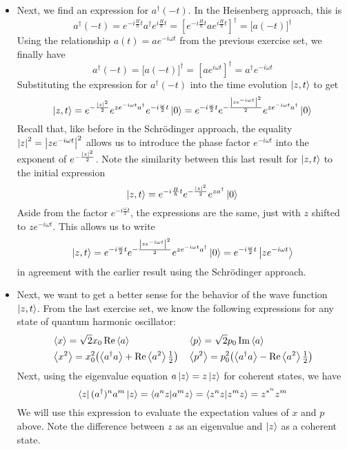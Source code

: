 \documentclass[11pt, a4paper]{article}
\newcommand{\Schro}{Schr\"{o}dinger\xspace}
\newcommand{\tev}{e^{-i\frac{H}{\hbar}t}}  %
\newcommand{\tevp}{e^{i\frac{H}{\hbar}t}}  %
\newcommand{\evb}[1]{\big \langle {#1} \big \rangle}  %
\begin{document}
\begin{itemize}
	\item Next, we find an expression for $ a^{\dagger}(-t) $. In the Heisenberg approach, this is
	\begin{equation*}
		a^{\dagger}(-t) = \tev a^{\dagger} \tevp = \left[\tev a \tevp\right]^{\dagger} = \big[a(-t)\big]^{\dagger}
	\end{equation*}
	Using the relationship $ a(t) = ae^{-i\omega t} $ from the previous exercise set, we finally have
	\begin{equation*}
		a^{\dagger}(-t) = \big[a(-t)\big]^{\dagger} = \left[ae^{i\omega t}\right]^{\dagger} = a^{\dagger}e^{-i\omega t}
	\end{equation*}
	Substituting the expression for $  a^{\dagger}(-t)  $ into the time evolution $ \ket{z, t} $ to get
	\begin{equation*}
		\ket{z, t} = e^{-\frac{\abs{z}^{2}}{2}}  e^{ze^{-i\omega t}a^{\dagger}} e^{-i\frac{\omega}{2}t}\ket{0} =  e^{-i\frac{\omega}{2}t} e^{-\frac{\abs{ze^{-i\omega t}}^{2}}{2}} e^{ze^{-i\omega t}a^{\dagger}}\ket{0}
	\end{equation*}
	Recall that, like before in the \Schro approach, the equality $ \abs{z}^{2} = \abs{ze^{-i\omega t}}^{2}$ allows us to introduce the phase factor $ e^{-i\omega t} $ into the exponent of $ e^{-\frac{\abs{z}^{2}}{2}} $. Note the similarity between this last result for $ \ket{z, t} $ to the initial expression 
	\begin{equation*}
		\ket{z, t} = \tev e^{-\frac{\abs{z}^{2}}{2}}e^{za^{\dagger}}\ket{0}
	\end{equation*}
	Aside from the factor $ e^{-i\frac{\omega}{2}t} $, the expressions are the same, just with $ z $ shifted to $ ze^{-i\omega t} $. This allows us to write
	\begin{equation*}
		\ket{z, t} =  e^{-i\frac{\omega}{2}t} e^{-\frac{\abs{ze^{-i\omega t}}^{2}}{2}} e^{ze^{-i\omega t}a^{\dagger}}\ket{0} = e^{-i\frac{\omega}{2}t}\ket{ze^{-i\omega t}}
	\end{equation*}
	in agreement with the earlier result using the \Schro approach. 
	
	\item Next, we want to get a better sense for the behavior of the wave function $ \ket{z, t} $. From the last exercise set, we know the following expressions for any state of quantum harmonic oscillator:
	\begin{align*}
		&\ev{x} = \sqrt{2}x_{0} \Re \ev{a} && \ev{p} = \sqrt{2} p_{0} \Im \ev{a}\\
		&\ev{x^{2}} = x_{0}^{2}\big(\evb{a^{\dagger}a} + \Re \ev{a^{2}} \tfrac{1}{2}\big) && \ev{p^{2}} = p_{0}^{2}\big(\evb{a^{\dagger}a} - \Re \ev{a^{2}} \tfrac{1}{2}\big)
	\end{align*}
	Next, using the eigenvalue equation $ a \ket{z} = z \ket{z} $ for coherent states, we have
	\begin{equation*}
		\bra{z}(a^{\dagger})^{n}a^{m}\ket{z} = \braket{a^{n}z}{a^{m}z} = \braket{z^{n}z}{z^{m}z} = z^{*^{n}}z^{m}
	\end{equation*}
	We will use this expression to evaluate the expectation values of $ x $ and $ p $ above. Note the difference between $ z $ as an eigenvalue and $ \ket{z} $ as a coherent state.
	

\end{itemize}
\end{document}
